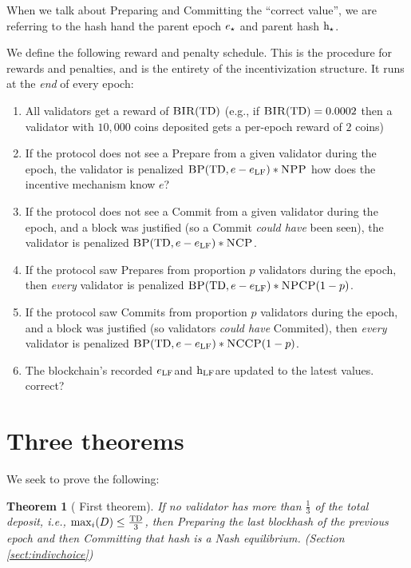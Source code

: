 \documentclass[12pt, final]{article}
\newcommand*{\todo}[1]{\color{red} #1}
\newtheorem{theorem}{Theorem}
\newcommand{\epoch}{\ensuremath{e}\space}
\newcommand{\hash}{\textnormal{h}\space}
\newcommand{\epochsource}{\ensuremath{\epoch_{\star}}\space}
\newcommand{\hashsource}{\ensuremath{\hash_{\star}}\space}
\newcommand{\totaldeposit}{\textnormal{TD}\space}
\newcommand{\epochLF}{\ensuremath{\epoch_{\textnormal{LF}}}\space}
\newcommand{\hashLF}{\ensuremath{\hash_{\textnormal{LF}}}\space}
\newcommand{\BIR}{\textsc{BIR}\space}
\newcommand{\BP}{\textsc{BP}\space}
\newcommand{\NCP}{\textsc{NCP}\space}
\newcommand{\NCCP}{\textsc{NCCP}\space}
\newcommand{\NPP}{\textsc{NPP}\space}
\newcommand{\NPCP}{\textsc{NPCP}\space}
\begin{document}
When we talk about Preparing and Committing the ``correct value'', we are referring to the hash \hash and the parent epoch $\epochsource$ and parent hash $\hashsource$.

We define the following reward and penalty schedule.  This is the procedure for rewards and penalties, and is the entirety of the incentivization structure.  It runs at the \emph{end} of every epoch:
    \begin{enumerate}
    \item All validators get a reward of $\BIR(\totaldeposit)$ (e.g., if $\BIR(\totaldeposit) = 0.0002$ then a validator with $10,000$ coins deposited gets a per-epoch reward of $2$ coins)
    \item If the protocol does not see a Prepare from a given validator during the epoch, the validator is penalized $\BP(\totaldeposit, \epoch - \epochLF) * \NPP$ \todo{how does the incentive mechanism know \epoch?}
    \item If the protocol does not see a Commit from a given validator during the epoch, and a block was justified (so a Commit \emph{could have} been seen), the validator is penalized $\BP(\totaldeposit, \epoch - \epochLF) * \NCP$.
    \item If the protocol saw Prepares from proportion $p$ validators during the epoch, then \emph{every} validator is penalized $\BP(\totaldeposit, \epoch - \epochLF) * \NPCP(1 - p)$.
    \item If the protocol saw Commits from proportion $p$ validators during the epoch, and a block was justified (so validators \emph{could have} Commited), then \emph{every} validator is penalized $\BP(\totaldeposit, \epoch - \epochLF) * \NCCP(1 - p)$.
    \item The blockchain's recorded \epochLF and \hashLF are updated to the latest values. \todo{correct?}
    \end{enumerate}




\section{Three theorems}

We seek to prove the following:

\begin{theorem}[\todo{First theorem}]
\label{theorem1}
If no validator has more than $\frac{1}{3}$ of the total deposit, i.e., $\max_i(D) \leq \frac{\totaldeposit}{3}$, then Preparing the last blockhash of the previous epoch and then Committing that hash is a Nash equilibrium. (Section \ref{sect:indivchoice})
\end{theorem}
\end{document}
